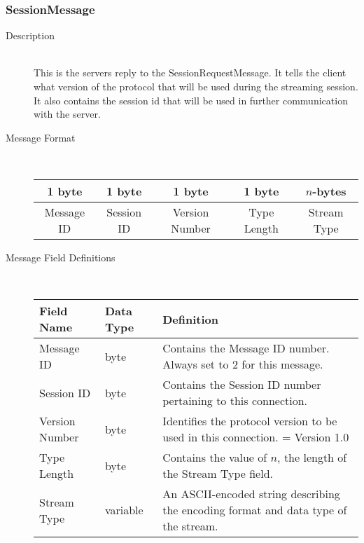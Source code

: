 \documentclass[12pt,letterpaper,titlepage]{article}
\begin{document}
\subsubsection{SessionMessage}
	\begin{description}
	\item[Description] \hfill \\
		This is the servers reply to the SessionRequestMessage. It tells the client what version of 
		the protocol that will be used during the streaming session. It also contains the session id 
		that will be used in further communication with the server.
	\item[Message Format] \hfill \\
	\begin{tabular}{ | c | c | c | c | c | }
		\hline
		1 byte & 1 byte & 1 byte & 1 byte & $n$-bytes \\
		\hline
		Message ID & Session ID &  Version Number & Type Length & Stream Type \\
		\hline
	\end{tabular}
	\item[Message Field Definitions] \hfill \\
	\begin{tabular}{ | p{3cm} | p{1.5cm} | p{8cm} | }
		\hline
		Field Name & Data Type & Definition \\
		\hline
		Message ID & byte & Contains the Message ID number. \newline Always set to 2 for this message. \\
		\hline
		Session ID & byte & Contains the Session ID number pertaining to this connection. \\
		\hline
		Version Number & byte & Identifies the protocol version to be used in this connection.
						\newline 1 = Version 1.0 \\
		\hline
        Type Length & byte & Contains the value of $n$, the length of the Stream Type field. \\
        \hline
        Stream Type & variable & An ASCII-encoded string describing the encoding format and data type of the stream. \\
        \hline
	\end{tabular}
	\end{description}
\end{document}
